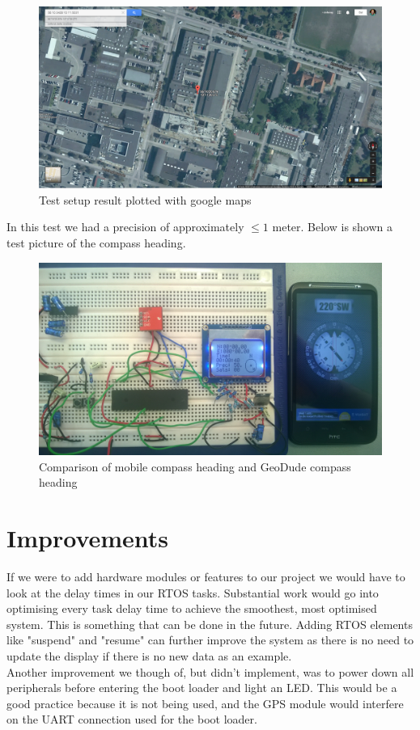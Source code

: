 \begin{figure}[H]
\centering
\includegraphics[width=.9\textwidth]{billeder/coordinate_map}
\caption{Test setup result plotted with google maps}
\end{figure}

In this test we had a precision of approximately $\leq1$ meter.
Below is shown a test picture of the compass heading.
\begin{figure}[H]
\centering
\includegraphics[width=.9\textwidth]{billeder/compas}
\caption{Comparison of mobile compass heading and GeoDude compass heading}
\end{figure}
\section{Improvements}
If we were to add hardware modules or features to our project we would have to look at the delay times in our RTOS tasks. Substantial work would go into optimising every task delay time to achieve the smoothest, most optimised system. This is something that can be done in the future. Adding RTOS elements like "suspend" and "resume" can further improve the system as there is no need to update the display if there is no new data as an example. \\
Another improvement we though of, but didn't implement, was to power down all peripherals before entering the boot loader and light an LED. This would be a good practice because it is not being used, and the GPS module would interfere on the UART connection used for the boot loader.

